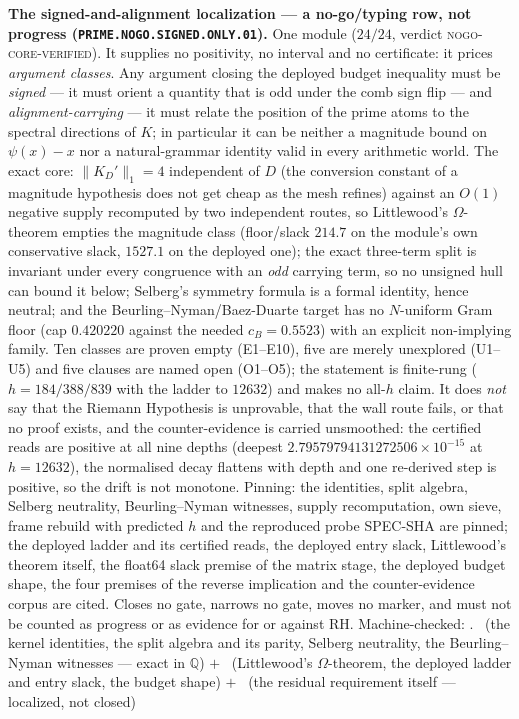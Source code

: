 \documentclass[11pt,a4paper]{article}
\theoremstyle{definition}
\begin{document}
\par\smallskip\noindent\textbf{The signed-and-alignment
localization --- a no-go/typing row, not progress
(\texttt{PRIME.NOGO.\allowbreak SIGNED.\allowbreak ONLY.01}).}
One module ($24/24$, verdict \textsc{nogo-core-verified}).  It
supplies no positivity, no interval and no certificate: it
prices \emph{argument classes}.  Any argument closing the
deployed budget inequality must be \emph{signed} --- it must
orient a quantity that is odd under the comb sign flip --- and
\emph{alignment-carrying} --- it must relate the position of the
prime atoms to the spectral directions of $K$; in particular it
can be neither a magnitude bound on $\psi(x) - x$ nor a
natural-grammar identity valid in every arithmetic world.  The
exact core: $\|K_D'\|_1 = 4$ independent of $D$ (the conversion
constant of a magnitude hypothesis does not get cheap as the
mesh refines) against an $O(1)$ negative supply recomputed by
two independent routes, so Littlewood's $\Omega$-theorem empties
the magnitude class (floor/slack $214.7$ on the module's own
conservative slack, $1527.1$ on the deployed one); the exact
three-term split is invariant under every congruence with an
\emph{odd} carrying term, so no unsigned hull can bound it
below; Selberg's symmetry formula is a formal identity, hence
neutral; and the Beurling--Nyman/Baez-Duarte target has no
$N$-uniform Gram floor (cap $0.420220$ against the needed
$c_B = 0.5523$) with an explicit non-implying family.  Ten
classes are proven empty (E1--E10), five are merely unexplored
(U1--U5) and five clauses are named open (O1--O5); the statement
is finite-rung ($h = 184/388/839$ with the ladder to $12632$)
and makes no all-$h$ claim.  It does \emph{not} say that the
Riemann Hypothesis is unprovable, that the wall route fails, or
that no proof exists, and the counter-evidence is carried
unsmoothed: the certified reads are positive at all nine depths
(deepest $2.79579794131272506\times10^{-15}$ at $h = 12632$),
the normalised decay flattens with depth and one re-derived step
is positive, so the drift is not monotone.  Pinning: the
identities, split algebra, Selberg neutrality,
Beurling--Nyman witnesses, supply recomputation, own sieve,
frame rebuild with predicted $h$ and the reproduced probe
SPEC-SHA are pinned; the deployed ladder and its certified
reads, the deployed entry slack, Littlewood's theorem itself,
the float64 slack premise of the matrix stage, the deployed
budget shape, the four premises of the reverse implication and
the counter-evidence corpus are cited.  Closes no gate, narrows
no gate, moves no marker, and must not be counted as progress or
as evidence for or against RH.
Machine-checked: .
\mE\ (the kernel identities, the split algebra and its parity,
Selberg neutrality, the Beurling--Nyman witnesses --- exact in
$\mathbb{Q}$) $+$ \mC\ (Littlewood's $\Omega$-theorem, the
deployed ladder and entry slack, the budget shape) $+$ \mO\ (the
residual requirement itself --- localized, not closed)
\par\smallskip
\end{document}
